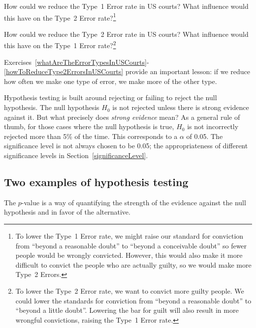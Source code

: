 \begin{spacing}{1.5}
\begin{exercise} \label{howToReduceType1ErrorsInUSCourts}
How could we reduce the Type~1 Error rate in US courts? What influence would this have on the Type~2 Error rate?\footnote{To lower the Type~1 Error rate, we might raise our standard for conviction from ``beyond a reasonable doubt'' to ``beyond a conceivable doubt'' so fewer people would be wrongly convicted. However, this would also make it more difficult to convict the people who are actually guilty, so we would make more Type~2 Errors.}
\end{exercise}

\begin{exercise} \label{howToReduceType2ErrorsInUSCourts}
How could we reduce the Type~2 Error rate in US courts? What influence would this have on the Type~1 Error rate?\footnote{To lower the Type~2 Error rate, we want to convict more guilty people. We could lower the standards for conviction from ``beyond a reasonable doubt'' to ``beyond a little doubt''. Lowering the bar for guilt will also result in more wrongful convictions, raising the Type~1 Error rate.}
\end{exercise}


Exercises~\ref{whatAreTheErrorTypesInUSCourts}-\ref{howToReduceType2ErrorsInUSCourts} provide an important lesson: if we reduce how often we make one type of error, we make more of the other type.

Hypothesis testing is built around rejecting or failing to reject the null hypothesis. The null hypothesis $H_0$ is not rejected unless there is strong evidence against it. But what precisely does \emph{strong evidence} mean? As a general rule of thumb, for those cases where the null hypothesis is true,  $H_0$ is not incorrectly rejected more than 5\% of the time. This corresponds to a $\alpha$ of 0.05. The significance level is not always chosen to be 0.05; the appropriateness of different significance levels in Section~\ref{significanceLevel}.


\subsection{Two examples of hypothesis testing}



The $p$-value is a way of quantifying the strength of the evidence against the null hypothesis and in favor of the alternative. 


\end{spacing}
